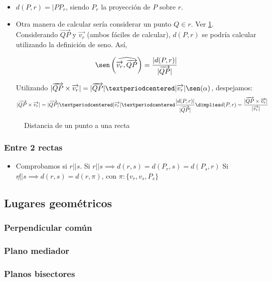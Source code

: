 \begin{itemize}
  \item $d(P,r) = |PP_{r}$, siendo $P_r$ la proyección de $P$ sobre $r$.
  \item Otra manera de calcular sería considerar un punto $Q\in r$. Ver \ref{fig::dist-punto-recta}.
  \subitem Considerando $\vec{QP}$ y $\vec{v_r}$ (ambos fáciles de calcular), $d(P,r)$ se podría calcular utilizando la definición de seno. Así,
  
  \[\sen\left(\widehat{\vec{v_r},\vec{QP}}\right) = \displaystyle\frac{|d(P,r)|}{|\vec{QP}|}\]

  \subitem Utilizando $|\vec{QP}\times\vec{v_r}| = |\vec{QP}|·|\vec{v_r}|\sen(\alpha)$, despejamos:
  \[
    |\vec{QP}\times\vec{v_r}| = |\vec{QP}|·|\vec{v_r}|·\frac{|d(P,r)|}{|\vec{QP}|} \dimplies d(P,r) = \frac{|\vec{QP}\times\vec{v_r}|}{|\vec{v_r}|}
  \]
\end{itemize}

\begin{figure}[hbtp]
\centering
{}

\label{fig::dist-punto-recta}
\caption{Distancia de un punto a una recta}
\end{figure}



\subsubsection{Entre 2 rectas}
\begin{itemize}
  \item Comprobamos si $r||s$. 
  \subitem Si $r||s \implies d(r,s) = d(P_r,s) = d(P_s,r)$
  \subitem Si $r\not|| s \implies d(r,s) = d(r,\pi)$, con $\pi:\{v_r,v_s,P_s\}$
\end{itemize}


\subsection{Lugares geométricos}
\subsubsection{Perpendicular común}
\subsubsection{Plano mediador}
\subsubsection{Planos bisectores}

